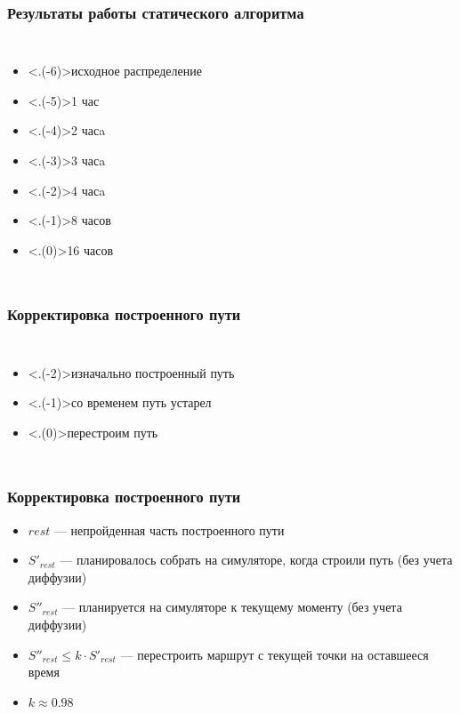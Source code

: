 \documentclass{beamer} %
\theoremstyle{definition} %
\def\putImg<#1>#2{ \includegraphics<#1>[width=\textwidth]{../img/#2} }
\begin{document}
\begin{frame}
\frametitle{Результаты работы статического алгоритма}
\begin{columns}

\begin{itemize}
\item<.(-6)>{исходное распределение}
\item<.(-5)>{1 час}
\item<.(-4)>{2 часa}
\item<.(-3)>{3 часa}
\item<.(-2)>{4 часa}
\item<.(-1)>{8 часов}
\item<.(0)>{16 часов}
\end{itemize}
\end{columns}
\end{frame}

\begin{frame}
\frametitle{Корректировка построенного пути}
\begin{columns}

\begin{itemize}
\item<.(-2)>{изначально построенный путь}
\item<.(-1)>{со временем путь устарел}
\item<.(0)>{перестроим путь}
\end{itemize}
\end{columns}

\end{frame}
\begin{frame}
\frametitle{Корректировка построенного пути}
\begin{itemize}
\item{$rest$ --- непройденная часть построенного пути}
\item{$S'_{rest}$ --- планировалось собрать на симуляторе, когда строили путь (без учета диффузии)}
\item{$S''_{rest}$ --- планируется на симуляторе к текущему моменту (без учета диффузии)}
\item{$S''_{rest} \le k \cdot S'_{rest}$ --- перестроить маршрут с текущей точки на оставшееся время}
\item{$k \approx 0.98$}
\end{itemize}
\end{frame}
\end{document}
